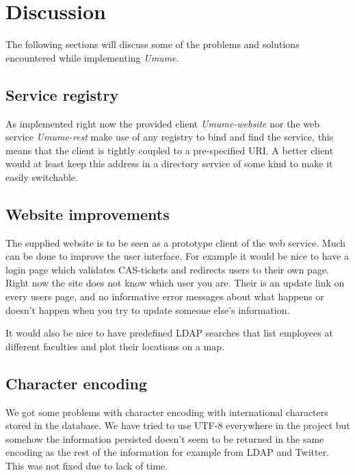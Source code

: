 \documentclass[titlepage, twocolumn, a4paper, 10pt]{article}
\begin{document}
\section{Discussion}\label{sec:discussion}
The following sections will discuss some of the problems and solutions
encountered while implementing \textit{Umume}.


\subsection{Service registry}
As implemented right now the provided client \textit{Umume-website}
nor the web service \textit{Umume-rest} make use of any registry to
bind and find the service, this means that the client is tightly
coupled to a pre-specified URI. A better client would at least keep
this address in a directory service of some kind to make it easily
switchable.

\subsection{Website improvements}
The supplied website is to be seen as a prototype client of the web
service. Much can be done to improve the user interface. For example
it would be nice to have a login page which validates CAS-tickets and
redirects users to their own page. Right now the site does not know
which user you are. Their is an update link on every users page, and
no informative error messages about what happens or doesn't happen
when you try to update someone else's information.

It would also be nice to have predefined LDAP searches that list
employees at different faculties and plot their locations on a map.

\subsection{Character encoding}
We got some problems with character encoding with international
characters stored in the database. We have tried to use UTF-8
everywhere in the project but somehow the information persisted
doesn't seem to be returned in the same encoding as the rest of the
information for example from LDAP and Twitter. This was not fixed due
to lack of time.
\end{document}
